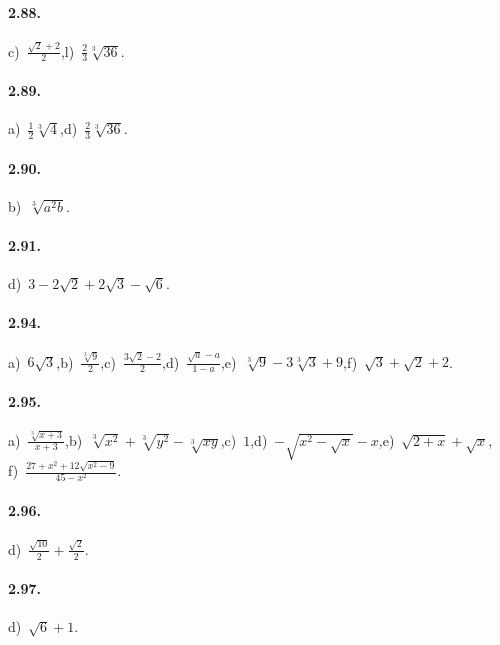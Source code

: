 \begin{multicols}{2}
\paragraph{2.88.}
c)~$\frac{\sqrt 2+2} 2$,\quad l)~$\frac 2 3\sqrt[3]{36}$.

\paragraph{2.89.}
a)~$\frac{1}{2}\sqrt[3]{4}$,\quad d)~$\frac{2}{3}\sqrt[3]{36}$.

\paragraph{2.90.}
b)~$\sqrt[3]{a^2b}$.

\paragraph{2.91.}
d)~$3-2\sqrt 2+2\sqrt 3-\sqrt 6$.
\end{multicols}

\paragraph{2.94.}
a)~$6\sqrt{3}$,\quad b)~$\frac{\sqrt[3]{9}}{2}$,\quad c)~$\frac{3\sqrt{2}-2}{2}$,\quad d)~$\frac{\sqrt{a}-a}{1-a}$,\quad e)~$\sqrt[3]{9}-3\sqrt[3]{3}+9$,\quad f)~$\sqrt{3}+\sqrt{2}+2$.

\paragraph{2.95.}
a)~$\frac{\sqrt[3]{x+3}}{x+3}$,\quad b)~$\sqrt[3]{x^2}+\sqrt[3]{y^2}-\sqrt[3]{xy}$,\quad c)~$1$,\quad d)~$-\sqrt{x^2-\sqrt{x}}-x$,\quad e)~$\sqrt{2+x}+\sqrt{x}$,\protect\\
\quad f)~$\frac{27+x^2+12\sqrt{x^2-9}}{45-x^2}$.

\begin{multicols}{2}
\paragraph{2.96.}
d)~$\frac{\sqrt{10}} 2+\frac{\sqrt 2} 2$.

\paragraph{2.97.}
d)~$\sqrt 6+1$.
\end{multicols}
